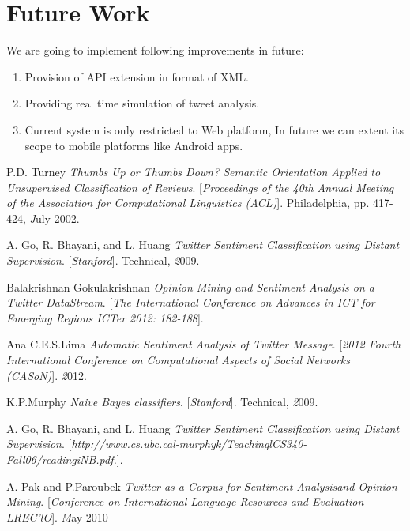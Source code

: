 \documentclass[a4paper,12pt]{report}
\begin{document}
	\section{Future Work}
	We are going to implement following improvements in future:
	\begin{enumerate}
		\item Provision of API extension in format of XML.
		\item Providing real time simulation of tweet analysis.
		\item Current system is only restricted to Web platform, In future we can extent its scope to mobile platforms like Android apps.
	\end{enumerate}
\begin{thebibliography}{9}
P.D. Turney
\textit{Thumbs Up or Thumbs Down? Semantic Orientation Applied to Unsupervised Classification of Reviews}. 
[\textit{Proceedings of the 40th Annual Meeting of the Association for Computational Linguistics (ACL)}].
Philadelphia, pp. 417-424,
\textit  July 2002.

 
A. Go, R. Bhayani, and L. Huang
\textit{Twitter Sentiment Classification using Distant Supervision}. 
[\textit{Stanford}].
Technical,
\textit  2009.

Balakrishnan Gokulakrishnan
\textit{Opinion Mining and Sentiment Analysis on a Twitter DataStream}. 
[\textit{The International Conference on Advances in ICT for Emerging Regions ICTer 2012: 182-188}].


Ana C.E.S.Lima
\textit{Automatic Sentiment Analysis of Twitter Message}. 
[\textit{2012 Fourth International Conference on Computational Aspects of Social Networks (CASoN)}].
\textit  2012.

K.P.Murphy
\textit{Naive Bayes classifiers}. 
[\textit{Stanford}].
Technical,
\textit  2009.

A. Go, R. Bhayani, and L. Huang
\textit{Twitter Sentiment Classification using Distant Supervision}. 
[\textit{http://www.cs.ubc.cal-murphyk/TeachinglCS340-Fall06/readingiNB.pdf.}].

A. Pak and P.Paroubek
\textit{Twitter as a Corpus for Sentiment Analysisand Opinion Mining}. 
[\textit{Conference on International Language Resources and Evaluation LREC'lO}].
\textit May 2010

\end{thebibliography}
\end{document}
